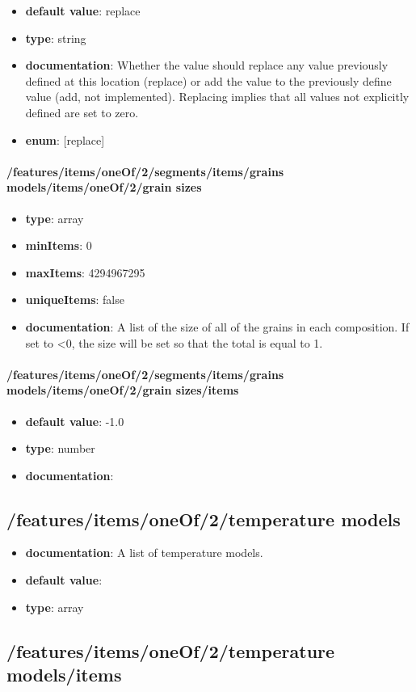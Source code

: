 \begin{itemize}\item {\bf default value}: replace
\item {\bf type}: string
\item {\bf documentation}: Whether the value should replace any value previously defined at this location (replace) or add the value to the previously define value (add, not implemented). Replacing implies that all values not explicitly defined are set to zero.
\item {\bf enum}: [replace]\end{itemize}\paragraph{/features/items/oneOf/2/segments/items/grains models/items/oneOf/2/grain sizes}
\begin{itemize}\item {\bf type}: array
\item {\bf minItems}: 0
\item {\bf maxItems}: 4294967295
\item {\bf uniqueItems}: false
\item {\bf documentation}: A list of the size of all of the grains in each composition. If set to <0, the size will be set so that the total is equal to 1.
\end{itemize}\paragraph{/features/items/oneOf/2/segments/items/grains models/items/oneOf/2/grain sizes/items}
\begin{itemize}\item {\bf default value}: -1.0
\item {\bf type}: number
\item {\bf documentation}: 
\end{itemize}\subsection{/features/items/oneOf/2/temperature models}
\begin{itemize}\item {\bf documentation}: A list of temperature models.
\item {\bf default value}: 
\item {\bf type}: array
\end{itemize}\subsection{/features/items/oneOf/2/temperature models/items}

